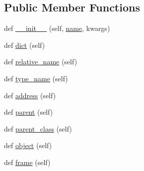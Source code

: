 \subsection*{Public Member Functions}
\begin{DoxyCompactItemize}
\item 
def \hyperlink{classmemoryoracle_1_1descriptions_1_1AddressableDescription_a069a1a2df438e4bd556f4df8f57b68da}{\+\_\+\+\_\+init\+\_\+\+\_\+} (self, \hyperlink{classmemoryoracle_1_1descriptions_1_1Description_a4b27c3ae1ef0ab35ec0f990fa553b8b3}{name}, kwargs)
\item 
def \hyperlink{classmemoryoracle_1_1descriptions_1_1AddressableDescription_a37c8fe09ba97c170b1c742cdb8ccce0d}{dict} (self)
\item 
def \hyperlink{classmemoryoracle_1_1descriptions_1_1AddressableDescription_a348866d0c2b8599a54e9f82f2966b4e8}{relative\+\_\+name} (self)
\item 
def \hyperlink{classmemoryoracle_1_1descriptions_1_1AddressableDescription_a7034b0f70e1481cd1dcdfe40bbc20964}{type\+\_\+name} (self)
\item 
def \hyperlink{classmemoryoracle_1_1descriptions_1_1AddressableDescription_a3977bdc75bbd263aa2de64b76c7fd4e0}{address} (self)
\item 
def \hyperlink{classmemoryoracle_1_1descriptions_1_1AddressableDescription_ae3227952e6fe71fef67246da632126ce}{parent} (self)
\item 
def \hyperlink{classmemoryoracle_1_1descriptions_1_1AddressableDescription_a81e8bea9458b92b9eb191f34765910e3}{parent\+\_\+class} (self)
\item 
def \hyperlink{classmemoryoracle_1_1descriptions_1_1AddressableDescription_ada5e53241cc0627c9d6626e928916aee}{object} (self)
\item 
def \hyperlink{classmemoryoracle_1_1descriptions_1_1AddressableDescription_ae2990546319af984b6fca1e78d854117}{frame} (self)
\end{DoxyCompactItemize}
